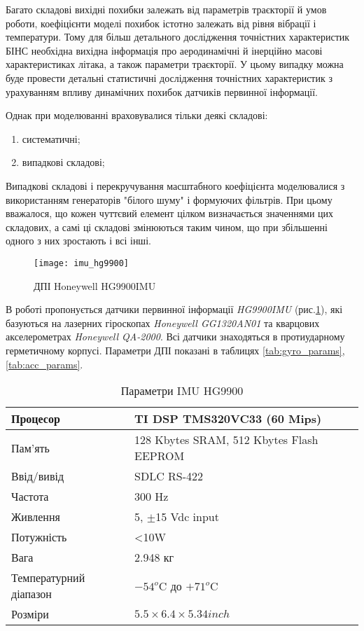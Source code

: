Багато складові вихідні похибки залежать від параметрів траєкторії й умов роботи, коефіцієнти моделі 
похибок істотно залежать від рівня вібрації і температури. Тому для більш детального дослідження 
точністних характеристик  БІНС необхідна вихідна інформація про аеродинамічні й інерційно масові 
характеристиках літака, а також параметри траєкторії. У цьому випадку можна буде провести детальні 
статистичні дослідження точністних характеристик з урахуванням впливу динамічних похибок датчиків первинної інформації.

Однак при моделюванні враховувалися тільки деякі складові:
\begin{enumerate}
  \item систематичні;
  \item випадкові складові;
\end{enumerate}

Випадкові складові і перекручування масштабного коефіцієнта моделювалися 
з використанням генераторів "білого шуму" і формуючих фільтрів. При цьому 
вважалося, що кожен чуттєвий елемент цілком визначається значеннями цих 
складових, а самі ці складові змінюються таким чином, що при збільшенні 
одного з них зростають і всі інші. 

\begin{figure}[here]
\centering
\texttt{[image: imu\_hg9900]}
\caption{ДПІ Honeywell HG9900IMU}
\label{fig:imu_hg9900}
\end{figure} 

В роботі пропонується датчики первинної інформації \textit{HG9900IMU} (рис.\ref{fig:imu_hg9900}),
які базуються на лазерних гіроскопах \textit{Honeywell GG1320AN01} та кварцових акселерометрах \textit{Honeywell QA-2000}. Всі датчики знаходяться в протиударному герметичному корпусі. Параметри ДПІ показані в таблицях \ref{tab:gyro_params},\ref{tab:acc_params}.

\begin{table}[H]
\centering
\caption{Параметри IMU HG9900}

\begin{tabular}{|p{60mm}|p{70mm}|} \hline

Процесор & TI DSP TMS320VC33 (60 Mips) \\ \hline 
Пам’ять & 128 Kbytes SRAM, 512 Kbytes Flash EEPROM \\ \hline 
Ввід/вивід & SDLC RS-422 \\ \hline 
Частота & 300 Hz  \\ \hline 
Живлення & 5, $\pm$15 Vdc input \\ \hline 
Потужність& <10W \\ \hline 
Вага & 2.948 кг  \\ \hline 
Температурний діапазон & $-54^{o}$C до $+71^{o}$C  \\ \hline
Розміри & $5.5\times6.4\times5.34 inch$\\ \hline 
\end{tabular}
\label{tab:imu_params}
\end{table}


